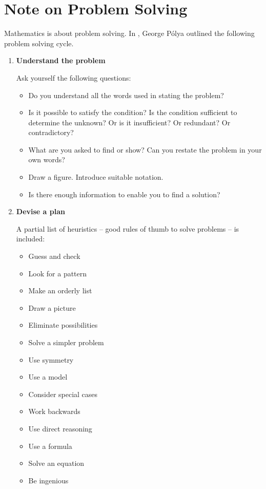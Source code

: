 \section*{Note on Problem Solving}
Mathematics is about problem solving. In \cite{polya}, George P\'{o}lya outlined the following problem solving cycle.
\begin{enumerate}
\item \textbf{Understand the problem}

Ask yourself the following questions:
\begin{itemize}
\item Do you understand all the words used in stating the problem?
\item Is it possible to satisfy the condition? Is the condition sufficient to determine the unknown? Or is it insufficient? Or redundant? Or contradictory?
\item What are you asked to find or show? Can you restate the problem in your own words?
\item Draw a figure. Introduce suitable notation.
\item Is there enough information to enable you to find a solution?
\end{itemize}

\item \textbf{Devise a plan}

A partial list of heuristics -- good rules of thumb to solve problems -- is included:
\begin{multicols}{2}
\begin{itemize}
\item Guess and check
\item Look for a pattern
\item Make an orderly list
\item Draw a picture
\item Eliminate possibilities
\item Solve a simpler problem
\item Use symmetry
\item Use a model
\item Consider special cases
\item Work backwards
\item Use direct reasoning
\item Use a formula
\item Solve an equation
\item Be ingenious
\end{itemize}
\end{multicols}


\end{enumerate}
